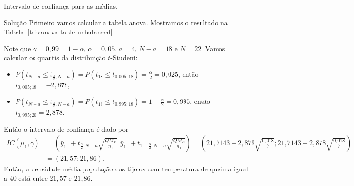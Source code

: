 \documentclass[8pt]{beamer}
\begin{document}
\begin{frame}{Intervalo de confiança para as médias.}

\scriptsize
\begin{block}{Solução}
	Primeiro vamos calcular a tabela anova. Mostramos o resultado na Tabela~\ref{tab:anova-table-unbalanced}.
	\begin{table}[ht]
		\centering
		\caption{Tabela ANOVA.} 
		\label{tab:anova-table-unbalanced}
	\end{table}
	
	Note que $\gamma = 0,99 = 1 - \alpha$, $\alpha = 0,05$, $a=4$, $N-a=18$ e $N = 22$. Vamos calcular os quantis da distribuição $t$-Student:
	\begin{itemize}
		\item $P\left( t_{N - a} \leq t_{\frac{\alpha}{2}, N - a} \right) = P\left( t_{18} \leq t_{0,005; 18} \right) = \frac{\alpha}{2} = 0,025$, então $t_{0,005; 18} = -2,878$;
		\item $P\left( t_{N - a} \leq t_{\frac{\alpha}{2}, N - a} \right) = P\left( t_{18} \leq t_{0,995; 18} \right) = 1- \frac{\alpha}{2} = 0,995$, então $t_{0,995; 20} =   2,878$.
	\end{itemize}
	
	Então o intervalo de confiança é dado por
	\begin{align*}
	IC(\mu_1, \gamma) &= \left( \bar{y}_{1\cdot} + t_{\frac{\alpha}{2};N - a} \sqrt{\frac{QM_E}{n_1}};  \bar{y}_{1\cdot} + t_{1-\frac{\alpha}{2};N - a} \sqrt{\frac{QM_E}{n_1}}  \right)= \left( 21,7143 - 2,878 \sqrt{\frac{0,018}{7}}; 21,7143 + 2,878 \sqrt{\frac{0,018}{7}} \right)\\ 
	&= \left( 21,57; 21,86 \right).
	\end{align*}
	Então, a densidade média população dos tijolos com temperatura de queima igual a $40$ está entre $21,57$ e $21,86$.	
\end{block}
\normalsize

\end{frame}
\end{document}
